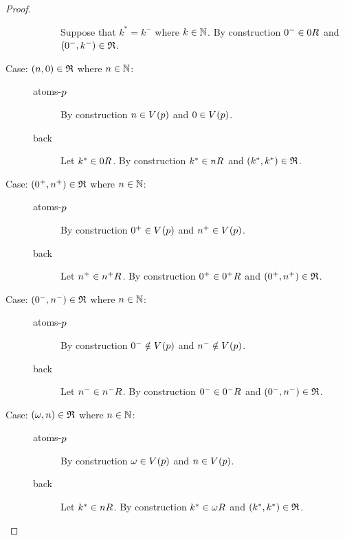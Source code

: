 \begin{proof}
\begin{description}
\begin{description}
                Suppose that $k^* = k^-$ where $k \in \mathbb{N}$.
                By construction $0^- \in \kSuccessors{}{0}$ and $(0^-, k^-) \in \mathfrak{R}$.
        \end{description}
    \item[Case: $(n, 0) \in \mathfrak{R}$ where $n \in \mathbb{N}$:]\hfill
        \begin{description}
            \item[atoms-$p$]
                By construction $n \in \kValuation(\atomP)$ and $0 \in \kValuation(\atomP)$.
            \item[back]
                Let $k^* \in \kSuccessors{}{0}$.
                By construction $k^* \in \kSuccessors{}{n}$ and $(k^*, k^*) \in \mathfrak{R}$.
        \end{description}
    \item[Case: $(0^+, n^+) \in \mathfrak{R}$ where $n \in \mathbb{N}$:]\hfill
        \begin{description}
            \item[atoms-$p$]
                By construction $0^+ \in \kValuation(\atomP)$ and $n^+ \in \kValuation(\atomP)$.
            \item[back]
                Let $n^+ \in \kSuccessors{}{n^+}$.
                By construction $0^+ \in \kSuccessors{}{0^+}$ and $(0^+, n^+) \in \mathfrak{R}$.
        \end{description}
    \item[Case: $(0^-, n^-) \in \mathfrak{R}$ where $n \in \mathbb{N}$:]\hfill
        \begin{description}
            \item[atoms-$p$]
                By construction $0^- \notin \kValuation(\atomP)$ and $n^- \notin \kValuation(\atomP)$.
            \item[back]
                Let $n^- \in \kSuccessors{}{n^-}$.
                By construction $0^- \in \kSuccessors{}{0^-}$ and $(0^-, n^-) \in \mathfrak{R}$.
        \end{description}
    \item[Case: $(\omega, n) \in \mathfrak{R}$ where $n \in \mathbb{N}$:]\hfill
        \begin{description}
            \item[atoms-$p$]
                By construction $\omega \in \kValuation(\atomP)$ and $n \in \kValuation(\atomP)$.
            \item[back]
                Let $k^* \in \kSuccessors{}{n}$.
                By construction $k^* \in \kSuccessors{}{\omega}$ and $(k^*, k^*) \in \mathfrak{R}$.

\end{description}
\end{description}
\end{proof}
